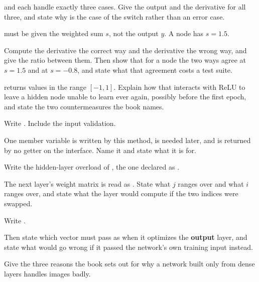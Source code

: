   and  each handle exactly three cases.
Give the output and the derivative for all three, and state why  is the
 case of the switch rather than an error case. 

  must be given the weighted sum $s$, not the output $y$. A
 node has $s = 1.5$.

Compute the derivative the correct way and the derivative the wrong way, and give the ratio between
them. Then show that for a  node the two ways agree at $s = 1.5$ and at $s = -0.8$, and
state what that agreement costs a test suite. 

  returns values in the range $[-1, 1]$. Explain how that
interacts with ReLU to leave a hidden node unable to learn ever again, possibly before the first
epoch, and state the two countermeasures the book names. 

\label{exa:q:5}

 Write . Include the input validation.

One member variable is written by this method, is needed later, and is returned by no getter on the
interface. Name it and state what it is for. 

 Write the hidden-layer overload of , the one declared as
.

The next layer's weight matrix is read as . State what $j$ ranges
over and what $i$ ranges over, and state what the layer would compute if the two indices were
swapped. 

 Write .

Then state which vector  must pass as  when it optimizes the
\textbf{output} layer, and state what would go wrong if it passed the network's own training input
instead. 

\label{exa:q:6}

 Give the three reasons the book sets out for why a network built only from dense layers
handles images badly. 

